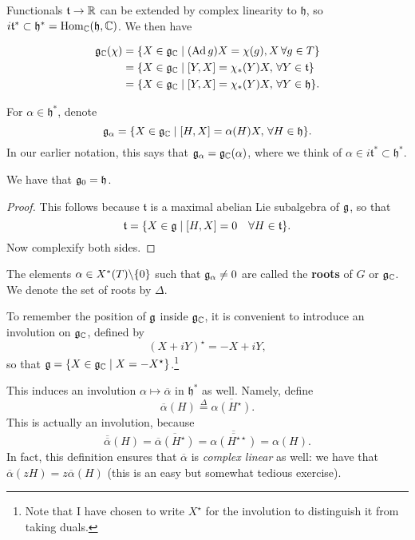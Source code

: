 \documentclass[11pt, english]{article}
\begin{document}
Functionals $\mathfrak t \to \mathbb{R}$ can be extended by complex linearity to $\mathfrak h$, so $i \mathfrak t^\ast \subset \mathfrak h^\ast = \operatorname{Hom}_{\mathbb{C}}(\mathfrak h, \mathbb{C})$. We then have

\begin{align*}
  \mathfrak g_{\mathbb{C}}(\chi) &= \{ X \in \mathfrak g_{\mathbb{C}} \mid (\operatorname{Ad} g)X = \chi(g), X\, \forall g \in T \} \\
&= \{ X \in \mathfrak g_{\mathbb{C}} \mid [Y,X] = \chi_\ast(Y)X, \,\forall Y \in \mathfrak t \} \\
&= \{ X \in \mathfrak g_{\mathbb{C}} \mid [Y,X] = \chi_\ast(Y)X, \, \forall Y \in \mathfrak h \}.
\end{align*}

For $\alpha \in \mathfrak h^\ast$, denote
$$
\mathfrak g_\alpha = \{ X \in \mathfrak g_{\mathbb{C}} \mid [H,X] = \alpha(H)X, \, \forall H \in \mathfrak h \}.
$$
In our earlier notation, this says that $\mathfrak g_{\alpha} = \mathfrak g_{\mathbb{C}}(\alpha)$, where we think of $\alpha \in i \mathfrak t^\ast \subset \mathfrak h^\ast$.

\begin{lemma}
We have that $\mathfrak g_0 = \mathfrak h$.
\end{lemma}
\begin{proof}
 This follows because $\mathfrak t$ is a maximal abelian Lie subalgebra of $\mathfrak g$, so that
$$
\mathfrak t = \{ X \in \mathfrak g \mid [H,X] = 0 \quad \forall H \in \mathfrak t \}.
$$
Now complexify both sides.
\end{proof}

The elements $\alpha \in X^\ast(T) \backslash \{ 0 \}$ such that $\mathfrak g_\alpha \neq 0$ are called the \textbf{roots} of $G$ or $\mathfrak g_{\mathbb{C}}$. We denote the set of roots by $\Delta$. 

To remember the position of $\mathfrak g$ inside $\mathfrak g_{\mathbb{C}}$, it is convenient to introduce an involution on $\mathfrak g_{\mathbb{C}}$, defined by
$$
(X+iY)^\star = -X + iY,
$$
so that $\mathfrak g = \{ X \in \mathfrak g_{\mathbb{C}} \mid X = -X^\star \}$.\footnote{Note that I have chosen to write $X^\star$ for the involution to distinguish it from taking duals.}

This induces an involution $\alpha \mapsto \overline \alpha$ in $\mathfrak h^\ast$ as well. Namely, define
$$
\overline \alpha(H) \stackrel{\Delta}{=} \overline{\alpha(H^\star)}.
$$
This is actually an involution, because
$$
\overline{\overline \alpha}(H) = \overline{\overline \alpha(H^\star)} = \overline{\overline{\alpha(H^{\star \star})}} = \alpha(H).
$$
In fact, this definition ensures that $\overline{\alpha}$ is \emph{complex linear} as well: we have that $\overline \alpha (zH) = z \overline \alpha(H)$ (this is an easy but somewhat tedious exercise).
\end{document}
